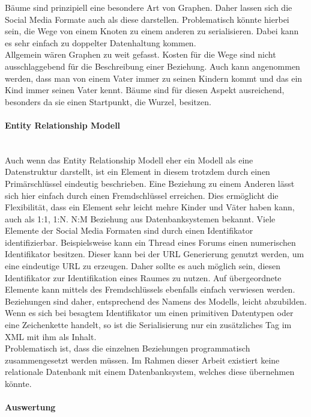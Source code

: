 \documentclass[a4paper]{article}
\begin{document}
	Bäume sind prinzipiell eine besondere Art von Graphen. Daher lassen sich
	die Social Media Formate auch als diese darstellen. Problematisch
	könnte hierbei sein, die Wege von einem Knoten zu einem anderen zu
	serialisieren. Dabei kann es sehr einfach zu doppelter Datenhaltung kommen. \\
	
	Allgemein wären Graphen zu weit gefasst. Kosten für die Wege sind nicht
	ausschlaggebend für die Beschreibung einer Beziehung. Auch kann angenommen
	werden, dass man von einem Vater immer zu seinen Kindern kommt und das ein Kind
	immer seinen Vater kennt. Bäume sind für diesen Aspekt ausreichend, besonders da
	sie einen Startpunkt, die Wurzel, besitzen.
	
	\paragraph{Entity Relationship Modell}\mbox{} \\
	
	Auch wenn das Entity Relationship Modell eher ein Modell als
	eine Datenstruktur darstellt, ist ein Element in diesem trotzdem
	durch einen Primärschlüssel eindeutig beschrieben.
	Eine Beziehung zu einem Anderen lässt sich hier einfach durch einen
	Fremdschlüssel erreichen. Dies ermöglicht die Flexibilität, dass ein Element
	sehr leicht mehre Kinder und Väter haben kann, auch als 1:1, 1:N. N:M Beziehung
	aus Datenbanksystemen bekannt. Viele Elemente der Social Media Formaten sind
	durch einen Identifikator identifizierbar. Beispielsweise kann ein Thread eines
	Forums einen numerischen Identifikator besitzen. Dieser kann bei der
	URL Generierung	genutzt werden, um eine eindeutige URL zu erzeugen. Daher sollte
	es auch möglich sein, diesen Identifikator zur Identifikation eines Raumes zu
	nutzen. Auf übergeordnete Elemente kann mittels des Fremdschlüssels ebenfalls
	einfach verwiesen werden. Beziehungen sind daher, entsprechend des Namens des
	Modells, leicht abzubilden.	Wenn es sich bei besagtem Identifikator um einen
	primitiven Datentypen oder eine Zeichenkette handelt, so ist die
	Serialisierung nur ein zusätzliches Tag im XML mit ihm als Inhalt. \\
	
	Problematisch ist, dass die einzelnen Beziehungen programmatisch 
	zusammengesetzt werden müssen. Im Rahmen dieser Arbeit existiert keine
	relationale	Datenbank mit einem Datenbanksystem, welches diese übernehmen
	könnte.
	
	\paragraph{Auswertung}\mbox{} \\
	
\end{document}
